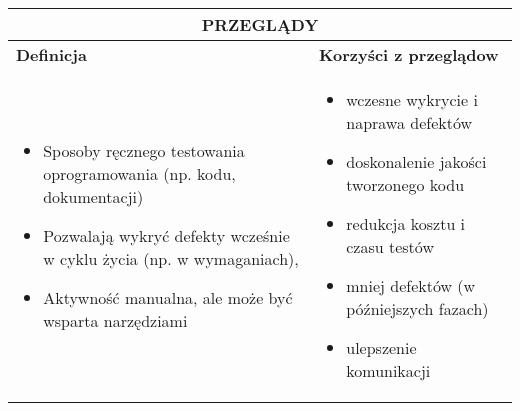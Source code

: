 \documentclass[../main.tex]{subfiles}
\begin{document}
    \begin{table}[H]
        \begin{center}
            \begin{tabular}{| p{8cm}| p{8cm}|}
                \hline
                \multicolumn{2}{|c|}{ \textbf{PRZEGLĄDY}}\\
                \hline
                \textbf{Definicja} & \textbf{Korzyści z przeglądow}\\
                \hline
                \begin{itemize}
                    \item Sposoby ręcznego testowania oprogramowania (np. kodu, dokumentacji)
                    \item Pozwalają wykryć defekty wcześnie w cyklu życia (np. w wymaganiach),
                    \item Aktywność manualna, ale może być wsparta narzędziami
                    \end{itemize}
                &
                \begin{itemize}
                    \item wczesne wykrycie i naprawa defektów
                    \item doskonalenie jakości tworzonego kodu
                    \item redukcja kosztu i czasu testów
                    \item mniej defektów (w późniejszych fazach)
                    \item ulepszenie komunikacji
                \end{itemize}\\
                \hline
            \end{tabular}
        \end{center}
    \end{table}
\end{document}
